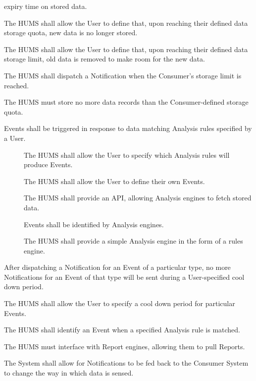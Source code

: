 \begin{description}
\begin{description}
			expiry time on stored data.
		  \item[\fr{4.4}] The HUMS shall allow the User to define that, 
			upon reaching their defined data storage quota, new data is 
			no longer stored.
		 \item[\fr{4.5}] The HUMS shall allow the User to define that, 
			upon reaching their defined data storage limit, old data is 
			removed to make room for the new data.
	\end{description}
	 \item[\fr{5}] The HUMS shall dispatch a Notification when the Consumer's 
		storage limit is reached.
	  \item[\fr{6}] The HUMS must store no more data records than the 	
		Consumer-defined storage quota.
	\item[\fr{7}] Events shall be triggered in response to data matching Analysis 
	rules specified by a User.
		  \begin{description}
			 \item[]  The HUMS shall allow the User to specify 	
			which Analysis rules will produce Events.
			 \item[] The HUMS shall allow the User to define their
 			own Events.
 			\item[] The HUMS shall provide an API, 			
			allowing Analysis engines to fetch stored data.
			\item[] Events shall be identified by Analysis engines.
 			\item[] The HUMS shall provide a simple Analysis 	
			engine in the form of a rules engine.
	\end{description}
	
	\item[\fr{8}] After dispatching a Notification for an Event of a particular 
		type, no more Notifications for an Event of that type will be 	
		sent during a User-specified cool down period.
			\item[\fr{8.1}] The HUMS shall allow the User to specify a cool down
				period for particular Events.
	\item[\fr{9}] The HUMS shall identify an Event when a specified Analysis 
		rule is matched.
	\item[\fr{10}] The HUMS must interface with Report engines, allowing 
		them to pull Reports.
	\item[\fr{11}] The System shall allow for Notifications to be fed back to the
		Consumer System to change the way in which data is sensed.
\end{description}

